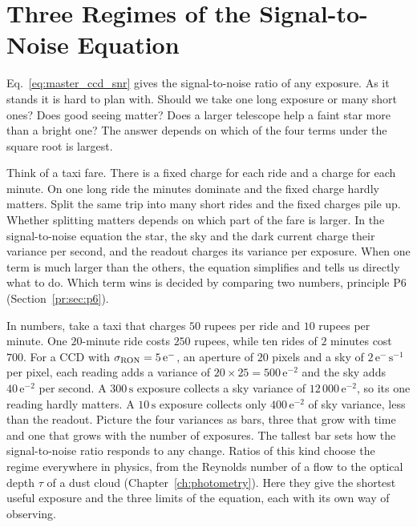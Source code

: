\section{Three Regimes of the Signal-to-Noise Equation}
\label{cc:sec:regimes}

Eq.~\eqref{eq:master_ccd_snr} gives the signal-to-noise ratio of any exposure. As it stands it is hard to plan with. Should we take one long exposure or many short ones? Does good seeing matter? Does a larger telescope help a faint star more than a bright one? The answer depends on which of the four terms under the square root is largest.

Think of a taxi fare. There is a fixed charge for each ride and a charge for each minute. On one long ride the minutes dominate and the fixed charge hardly matters. Split the same trip into many short rides and the fixed charges pile up. Whether splitting matters depends on which part of the fare is larger. In the signal-to-noise equation the star, the sky and the dark current charge their variance per second, and the readout charges its variance per exposure. When one term is much larger than the others, the equation simplifies and tells us directly what to do. Which term wins is decided by comparing two numbers, principle P6 (Section~\ref{pr:sec:p6}).

In numbers, take a taxi that charges $50$ rupees per ride and $10$ rupees per minute. One $20$-minute ride costs $250$ rupees, while ten rides of $2$ minutes cost $700$. For a CCD with $\sigma_{\rm RON}=5\,\mathrm{e^-}$, an aperture of $20$ pixels and a sky of $2\,\mathrm{e^-\,s^{-1}}$ per pixel, each reading adds a variance of $20\times25=500\,\mathrm{e^{-2}}$ and the sky adds $40\,\mathrm{e^{-2}}$ per second. A $300\,\mathrm s$ exposure collects a sky variance of $12\,000\,\mathrm{e^{-2}}$, so its one reading hardly matters. A $10\,\mathrm s$ exposure collects only $400\,\mathrm{e^{-2}}$ of sky variance, less than the readout. Picture the four variances as bars, three that grow with time and one that grows with the number of exposures. The tallest bar sets how the signal-to-noise ratio responds to any change. Ratios of this kind choose the regime everywhere in physics, from the Reynolds number of a flow to the optical depth $\tau$ of a dust cloud (Chapter~\ref{ch:photometry}). Here they give the shortest useful exposure and the three limits of the equation, each with its own way of observing.

